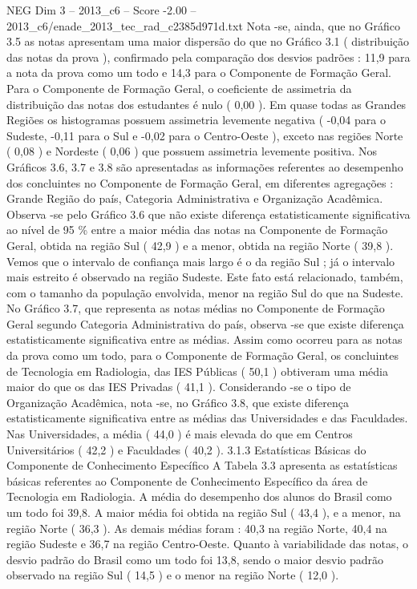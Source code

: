 \begin{textsample}{NEG Dim 3 – 2013\_c6 – Score -2.00 – 2013\_c6/enade\_2013\_tec\_rad\_c2385d971d.txt}
Nota -se, ainda, que no Gráfico 3.5 as notas apresentam uma maior dispersão do que no Gráfico 3.1 ( distribuição das notas da prova ), confirmado pela comparação dos desvios padrões : 11,9 para a nota da prova como um todo e 14,3 para o Componente de Formação Geral.
Para o Componente de Formação Geral, o coeficiente de assimetria da distribuição das notas dos estudantes é nulo ( 0,00 ).
Em quase todas as Grandes Regiões os histogramas possuem assimetria levemente negativa ( -0,04 para o Sudeste, -0,11 para o Sul e -0,02 para o Centro-Oeste ), exceto nas regiões Norte ( 0,08 ) e Nordeste ( 0,06 ) que possuem assimetria levemente positiva.
Nos Gráficos 3.6, 3.7 e 3.8 são apresentadas as informações referentes ao desempenho dos concluintes no Componente de Formação Geral, em diferentes agregações : Grande Região do país, Categoria Administrativa e Organização Acadêmica.
Observa -se pelo Gráfico 3.6 que não existe diferença estatisticamente significativa ao nível de 95 \% entre a maior média das notas na Componente de Formação Geral, obtida na região Sul ( 42,9 ) e a menor, obtida na região Norte ( 39,8 ).
Vemos que o intervalo de confiança mais largo é o da região Sul ; já o intervalo mais estreito é observado na região Sudeste.
Este fato está relacionado, também, com o tamanho da população envolvida, menor na região Sul do que na Sudeste.
No Gráfico 3.7, que representa as notas médias no Componente de Formação Geral segundo Categoria Administrativa do país, observa -se que existe diferença estatisticamente significativa entre as médias.
Assim como ocorreu para as notas da prova como um todo, para o Componente de Formação Geral, os concluintes de Tecnologia em Radiologia, das IES Públicas ( 50,1 ) obtiveram uma média maior do que os das IES Privadas ( 41,1 ).
Considerando -se o tipo de Organização Acadêmica, nota -se, no Gráfico 3.8, que existe diferença estatisticamente significativa entre as médias das Universidades e das Faculdades.
Nas Universidades, a média ( 44,0 ) é mais elevada do que em Centros Universitários ( 42,2 ) e Faculdades ( 40,2 ). 3.1.3 Estatísticas Básicas do Componente de Conhecimento Específico A Tabela 3.3 apresenta as estatísticas básicas referentes ao Componente de Conhecimento Específico da área de Tecnologia em Radiologia.
A média do desempenho dos alunos do Brasil como um todo foi 39,8.
A maior média foi obtida na região Sul ( 43,4 ), e a menor, na região Norte ( 36,3 ).
As demais médias foram : 40,3 na região Norte, 40,4 na região Sudeste e 36,7 na região Centro-Oeste.
Quanto à variabilidade das notas, o desvio padrão do Brasil como um todo foi 13,8, sendo o maior desvio padrão observado na região Sul ( 14,5 ) e o menor na região Norte ( 12,0 ).

\end{textsample}
